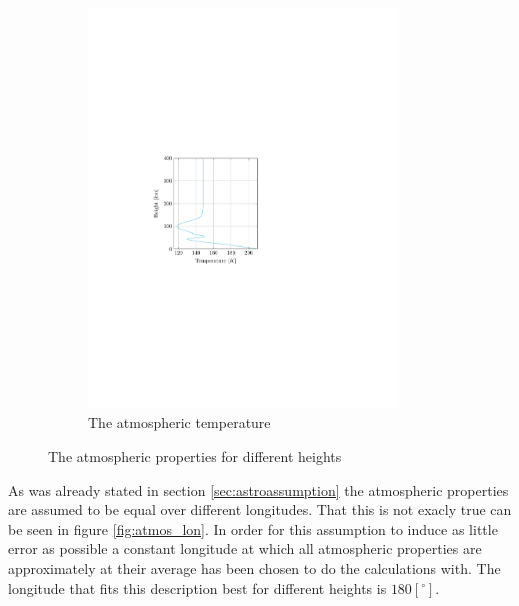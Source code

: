 \begin{figure}[ht!]
\begin{subfigure}{0.45\textwidth}
	\includegraphics[trim={4cm 9.8cm 9cm 10cm},clip,width=0.9\textwidth]{Figure/atmos_model/temperature.pdf}
	\caption{The atmospheric temperature}
	\label{fig:atmos_height_T}
	\end{subfigure}
	\caption{The atmospheric properties for different heights}
	\label{fig:atmos_height}
\end{figure}

As was already stated in section \ref{sec:astroassumption} the atmospheric properties are assumed to be equal over different longitudes. That this is not exacly true can be seen in figure \ref{fig:atmos_lon}. In order for this assumption to induce as little error as possible a constant longitude at which all atmospheric properties are approximately at their average has been chosen to do the calculations with. The longitude that fits this description best for different heights is $180 \left[^\circ\right]$.

